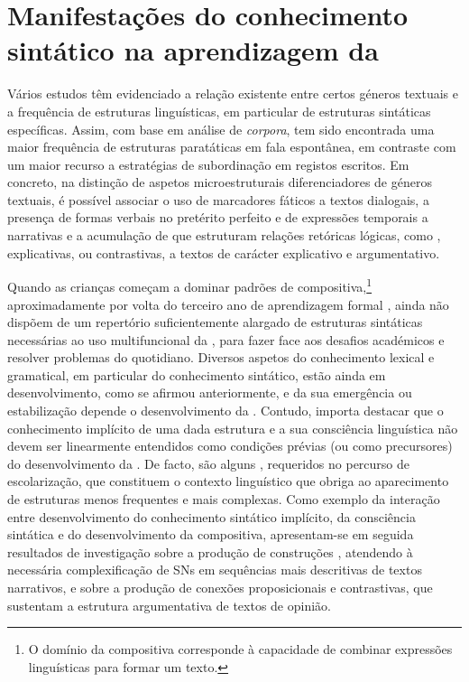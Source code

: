 \documentclass[output=paper]{LSP/langsci}
\begin{document}
\section{Manifestações do conhecimento sintático na aprendizagem da }
\label{sec:costacostagoncalves_manifestacoes}

Vários estudos têm evidenciado a relação existente entre certos géneros textuais e a frequência de estruturas linguísticas, em particular de estruturas sintáticas específicas. Assim, com base em análise de \textit{corpora}, tem sido encontrada uma maior frequência de estruturas paratáticas em fala espontânea, em contraste com um maior recurso a estratégias de subordinação em registos escritos. Em concreto, na distinção de aspetos microestruturais diferenciadores de géneros textuais, é possível associar o uso de marcadores fáticos a textos dialogais, a presença de formas verbais no pretérito perfeito e de expressões temporais a narrativas e a acumulação de  que estruturam relações retóricas lógicas, como , explicativas,  ou contrastivas, a textos de carácter explicativo e argumentativo.

Quando as crianças começam a dominar padrões de  compositiva,\footnote{O domínio da  compositiva corresponde à capacidade de combinar expressões linguísticas para formar um texto.} aproximadamente por volta do terceiro ano de aprendizagem formal \citep{martinsniza1998}, ainda não dispõem de um repertório suficientemente alargado de estruturas sintáticas necessárias ao uso multifuncional da , para fazer face aos desafios académicos e resolver problemas do quotidiano. Diversos aspetos do conhecimento lexical e gramatical, em particular do conhecimento sintático, estão ainda em desenvolvimento, como se afirmou anteriormente, e da sua emergência ou estabilização depende o desenvolvimento da . Contudo, importa destacar que o conhecimento implícito de uma dada estrutura e a sua consciência linguística não devem ser linearmente entendidos como condições prévias (ou como precursores) do desenvolvimento da . De facto, são alguns , requeridos no percurso de escolarização, que constituem o contexto linguístico que obriga ao aparecimento de estruturas menos frequentes e mais complexas. Como exemplo da interação entre desenvolvimento do conhecimento sintático implícito, da consciência sintática e do desenvolvimento da  compositiva, apresentam-se em seguida resultados de investigação sobre a produção de construções , atendendo à necessária complexificação de SNs em sequências mais descritivas de textos narrativos, e sobre a produção de conexões proposicionais  e contrastivas, que sustentam a estrutura argumentativa de textos de opinião.
\end{document}
